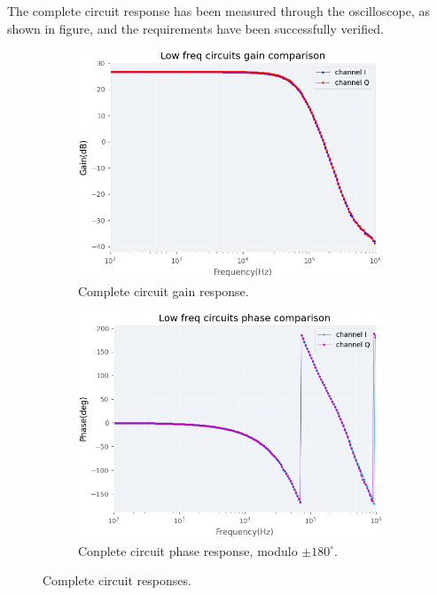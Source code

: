 \documentclass[12pt]{article}
\begin{document}
The complete circuit response has been measured through the oscilloscope, as shown in figure, and the requirements have been successfully verified.
\begin{figure}[H]
    \centering
    \begin{subfigure}{0.49\textwidth}
    \includegraphics[width=\textwidth]{circuitgain.png}
    \caption{Complete circuit gain response.}
    \end{subfigure}
    \begin{subfigure}{0.49\textwidth}
     \includegraphics[width=\textwidth]{circuitphase.png}
           \caption{Conplete circuit phase response, modulo $\pm180^{\circ}$.}
    \end{subfigure}
    \caption{Complete circuit responses.}
    \end{figure}
\end{document}
